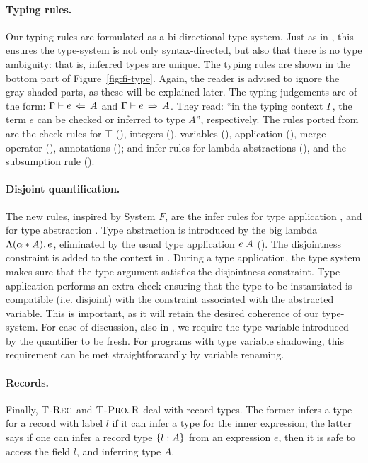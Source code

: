 \paragraph{Typing rules.}
Our typing rules are formulated as a bi-directional type-system. 
Just as in \oldname, this ensures the type-system is not only syntax-directed, but
also that there is no type ambiguity: that is, inferred types are unique.
The typing rules are shown in the bottom part of Figure~\ref{fig:fi-type}. 
Again, the reader is advised to ignore the
gray-shaded parts, as these will be explained later. 
The typing judgements are of the form: $\Gamma \vdash e \ \!\Leftarrow\! \ A$ and  
$\Gamma \vdash e \ \!\Rightarrow\! \ A$.
They read: ``in the typing context $\Gamma$, the term $e$ can be
checked or inferred to
type $A$'', respectively. 
The rules ported from \oldname are the
check rules for $\top$ (), integers (), 
variables (),  application (), merge operator  
(), annotations (); and infer rules
for lambda abstractions (), and the subsumption rule 
().

\paragraph{Disjoint quantification.}
The new rules, inspired by System $F$, are the infer rules for type
application , and for type abstraction
.  Type abstraction is introduced by the big
lambda $\Lambda (\alpha* A).\, e$, eliminated by the usual type application
$e \; A$ ().  The disjointness constraint is
added to the context in . During a type application, the
type system makes sure that the type argument satisfies the
disjointness constraint.  Type application performs an extra check
ensuring that the type to be instantiated is compatible
(i.e. disjoint) with the constraint associated with the abstracted
variable.  This is important, as it will retain the desired coherence
of our type-system.  For ease of discussion, also in
, we require the type variable introduced by the
quantifier to be fresh.  For programs with type variable shadowing,
this requirement can be met straightforwardly by variable renaming.

\paragraph{Records.}
Finally, $\textsc{T-Rec}$ and $\textsc{T-ProjR}$ deal with record types.
The former infers a type for a record with label $l$ if it can infer a type for the
inner expression; the latter says if one can infer a record type $\{ l : A \}$ 
from an expression $e$, then it is safe to access the field $l$, and inferring type $A$.

